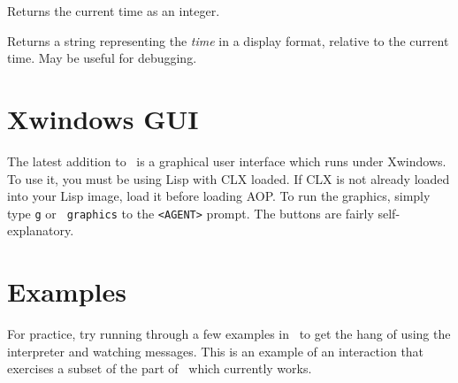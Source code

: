 Returns the current time as an integer.

Returns a string representing the {\em time\/} in a display format,
relative to the current time.  May be useful for debugging.


\section{Xwindows GUI}

The latest addition to \ is a graphical user interface which runs
under Xwindows.  To use it, you must be using Lisp with CLX loaded.
If CLX is not already loaded into your Lisp image, load it before
loading AOP.  To run the graphics, simply type {\tt g} or {\tt
graphics} to the {\tt <AGENT>} prompt.  The buttons are fairly
self-explanatory.

\section{Examples}

For practice, try running through a few examples in \ao\ to get the
hang of using the interpreter and watching messages.  This is an
example of an interaction that exercises a subset of the part of \ao\
which currently works.


